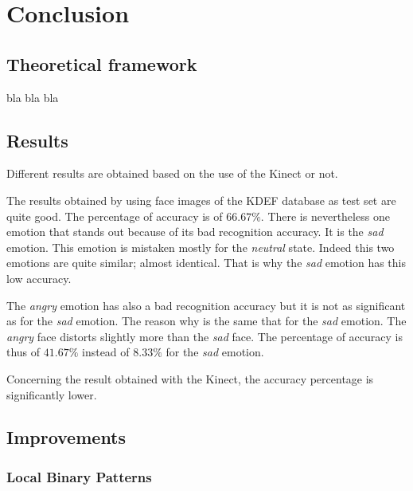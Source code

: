 \chapter{Conclusion}
\label{chap:ccl}
  
\section{Theoretical framework}

\vspace{\baselineskip}
\noindent bla bla bla
\newline

\section{Results}

\vspace{\baselineskip}
\noindent Different results are obtained based on the use of the Kinect or not.
\newline

\noindent The results obtained by using face images of the KDEF database as test set are quite good. The percentage of accuracy is of $ 66.67\% $. There is nevertheless one emotion that stands out because of its bad recognition accuracy. It is the \textit{sad} emotion. This emotion is mistaken mostly for the \textit{neutral} state. Indeed this two emotions are quite similar; almost identical. That is why the \textit{sad} emotion has this low accuracy.
\newline

\noindent The \textit{angry} emotion has also a bad recognition accuracy but it is not as significant as for the \textit{sad} emotion. The reason why is the same that for the \textit{sad} emotion. The \textit{angry} face distorts slightly more than the \textit{sad} face. The percentage of accuracy is thus of $ 41.67\% $ instead of $ 8.33\% $ for the \textit{sad} emotion.
\newline

\noindent Concerning the result obtained with the Kinect, the accuracy percentage is significantly lower.
\newline

\section{Improvements}

\subsection{Local Binary Patterns}

